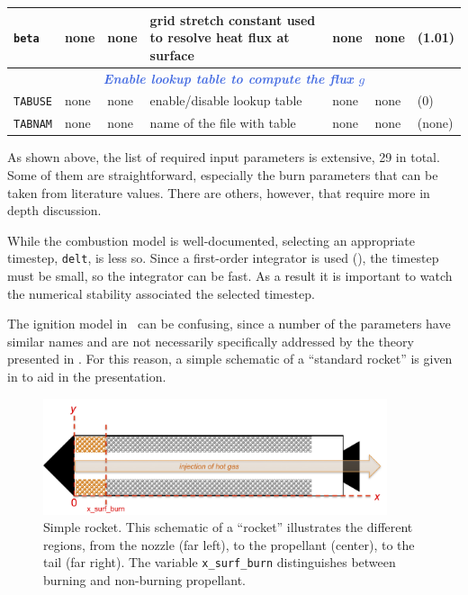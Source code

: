 \begin{small}
\begin{center}
\begin{longtable}[H]{ m{2.2cm} | m{1.0cm} m{1.5cm} | m{5.5cm} | m{1.9cm} | m{2.7cm} m{1.2cm} }
\texttt{beta} & none & none &  grid stretch constant used to resolve heat flux at surface & none & none & (1.01) \\ \hline

\hline \multicolumn{7}{c}{\textcolor{RoyalBlue}{\textit{\textbf{Enable lookup table to compute the flux $g$}}}} \\ \hline \hline

\texttt{TABUSE} & none & none &  enable/disable lookup table & none & none & (0) \\ \hline

\texttt{TABNAM} & none & none &  name of the file with table & none & none & (none) \\

\hline\hline\hline
\end{longtable}
\endgroup
\end{center}
\end{small}

As shown above, the list of required input parameters is extensive, 29 in total. Some of them are straightforward, especially the burn parameters that can be taken from literature values. There are others, however, that require more in depth discussion.


While the combustion model is well-documented, selecting an appropriate timestep, \texttt{delt}, is less so. Since a first-order integrator is used (), the timestep must be small, so the integrator can be fast. As a result it is important to watch the numerical stability associated the selected timestep.


The ignition model in \Rocburn\ can be confusing, since a number of the parameters have similar names and are not necessarily specifically addressed by the theory presented in . For this reason, a simple schematic of a ``standard rocket'' is given in  to aid in the presentation.

\begin{figure}[ht]
\centering
\includegraphics[width=0.9\textwidth]{../Figures/rocket.png}
\caption{Simple rocket. This schematic of a ``rocket'' illustrates the different regions, from the nozzle (far left), to the propellant (center), to the tail (far right). The variable \texttt{x\_surf\_burn} distinguishes between burning and non-burning propellant.}
\label{fig:rocket}
\end{figure}

